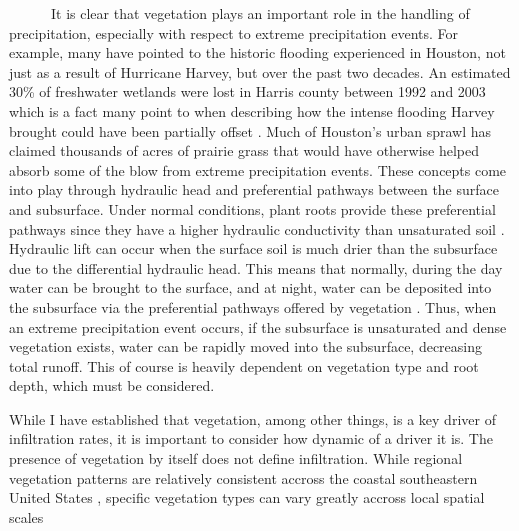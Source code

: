 \documentclass[
]{book}
\begin{document}
~~~~~~It is clear that vegetation plays an important role in the handling of precipitation, especially with respect to extreme precipitation events. For example, many have pointed to the historic flooding experienced in Houston, not just as a result of Hurricane Harvey, but over the past two decades. An estimated 30\% of freshwater wetlands were lost in Harris county between 1992 and 2003 which is a fact many point to when describing how the intense flooding Harvey brought could have been partially offset \citep{satija2014}. Much of Houston's urban sprawl has claimed thousands of acres of prairie grass that would have otherwise helped absorb some of the blow from extreme precipitation events. These concepts come into play through hydraulic head and preferential pathways between the surface and subsurface. Under normal conditions, plant roots provide these preferential pathways since they have a higher hydraulic conductivity than unsaturated soil \citep{caldwell1989hydraulic}. Hydraulic lift can occur when the surface soil is much drier than the subsurface due to the differential hydraulic head. This means that normally, during the day water can be brought to the surface, and at night, water can be deposited into the subsurface via the preferential pathways offered by vegetation \citep{hornberger2014elements}. Thus, when an extreme precipitation event occurs, if the subsurface is unsaturated and dense vegetation exists, water can be rapidly moved into the subsurface, decreasing total runoff. This of course is heavily dependent on vegetation type and root depth, which must be considered.

While I have established that vegetation, among other things, is a key driver of infiltration rates, it is important to consider how dynamic of a driver it is. The presence of vegetation by itself does not define infiltration. While regional vegetation patterns are relatively consistent accross the coastal southeastern United States \citep{mills2013identification}, specific vegetation types can vary greatly accross local spatial scales
\end{document}
